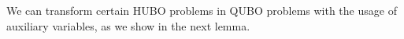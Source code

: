 






We can transform certain HUBO problems in QUBO problems with the usage of auxiliary variables, as we show in the next lemma.

